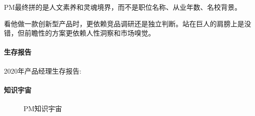 \documentclass[letterpaper,10pt,english]{sphinxmanual}
\begin{document}
PM最终拼的是人文素养和灵魂境界，而不是职位名称、从业年数、名校背景。

看他做一款创新型产品时，更依赖竞品调研还是独立判断。站在巨人的肩膀上是没错，但前瞻性的方案更依赖人性洞察和市场嗅觉。


\paragraph{生存报告}
\label{\detokenize{chapter_introduction/PM:id64}}
2020年产品经理生存报告:


\paragraph{知识宇宙}
\label{\detokenize{chapter_introduction/PM:id65}}
\begin{figure}[H]
\centering
\capstart

\noindent{}
\caption{PM知识宇宙\sphinxfootnotemark[213]}\label{\detokenize{chapter_introduction/PM:id77}}\end{figure}
%
\begin{footnotetext}[213]\sphinxAtStartFootnote
{}
%
\end{footnotetext}\ignorespaces 
\end{document}
